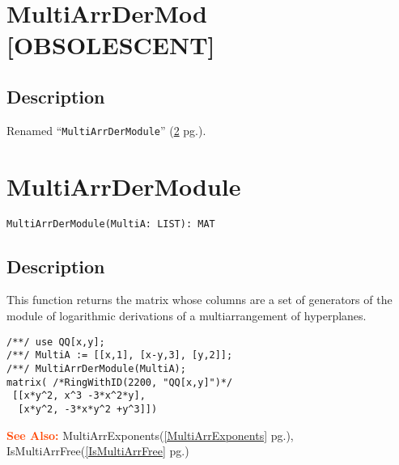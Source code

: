 \documentclass[a4paper]{mybook}
\newenvironment{command}{}{} %
\newcommand\SeeAlso{\par\textcolor{OrangeRed}{\textbf{\large See Also: }}}
\begin{document}
\section{MultiArrDerMod [OBSOLESCENT]}
\label{MultiArrDerMod [OBSOLESCENT]}
\begin{command} %



\subsection*{Description}

Renamed ``\verb&MultiArrDerModule&'' (\ref{MultiArrDerModule} pg.\pageref{MultiArrDerModule}).

\end{command} %

\section{MultiArrDerModule}
\label{MultiArrDerModule}
\begin{command} %


\begin{Verbatim}[label=syntax, rulecolor=\color{MidnightBlue},
frame=single]
MultiArrDerModule(MultiA: LIST): MAT 
\end{Verbatim}


\subsection*{Description}

This function returns the matrix whose columns are a set of generators
of the module of logarithmic derivations of a multiarrangement of hyperplanes.
\begin{Verbatim}[label=example, rulecolor=\color{PineGreen}, frame=single]
/**/ use QQ[x,y];	
/**/ MultiA := [[x,1], [x-y,3], [y,2]];
/**/ MultiArrDerModule(MultiA);
matrix( /*RingWithID(2200, "QQ[x,y]")*/
 [[x*y^2, x^3 -3*x^2*y],
  [x*y^2, -3*x*y^2 +y^3]])	
\end{Verbatim}


\SeeAlso %
  MultiArrExponents(\ref{MultiArrExponents} pg.\pageref{MultiArrExponents}), 
    IsMultiArrFree(\ref{IsMultiArrFree} pg.\pageref{IsMultiArrFree})
\end{command} %
\end{document}
